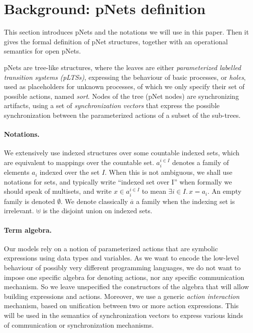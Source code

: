 \documentclass{lncs/llncs}
\begin{document}
\section{Background: pNets definition}
\label{section:pnets}

This section introduces pNets and the notations we will use in
this paper. Then it gives the formal definition of pNet structures,
together with an operational semantics for open pNets.

pNets are tree-like structures, where the leaves are either
\emph{parameterized labelled transition systems (pLTSs)}, expressing the
behaviour of basic processes, or \emph{holes}, used as placeholders
for unknown processes, of which we only specify their set of possible
actions, named \emph{sort}.
Nodes of the tree (pNet nodes) are synchronizing artifacts, using a
set of \emph{synchronization vectors} that express the possible
synchronization between the parameterized actions of a subset of the
sub-trees.


\paragraph*{Notations.}
We extensively use indexed structures
over some countable indexed sets, which are equivalent to mappings over
the countable set. %
$a_i^{i\in I}$
denotes a family of elements $a_i$ indexed over the
set $I$.
When this is not
ambiguous, we shall use notations for sets, and typically write
``indexed set over I'' when formally we should speak of multisets, and
write $x\in a_i^{i\in I}$ to mean $\exists i\in I.\, x=a_i$.  An empty
family is denoted $\emptyset$. We
denote classically $\overline{a}$ a family when the indexing set is
irrelevant.  $\uplus$ is the disjoint union on indexed sets.

\paragraph*{Term algebra.}
Our models rely on a notion of parameterized actions that are
symbolic expressions using data types and variables. As we want to encode
the low-level behaviour of possibly very different
programming languages, we do not want to impose one specific algebra
for denoting actions, nor any specific communication mechanism. So we
leave unspecified the constructors of the algebra that will allow building
expressions and actions. Moreover, we use a generic {\em action interaction}
mechanism, based on unification between two or more action
expressions. This will be used in the semantics of synchronization
vectors to express various kinds of communication or synchronization mechanisms.
\end{document}
